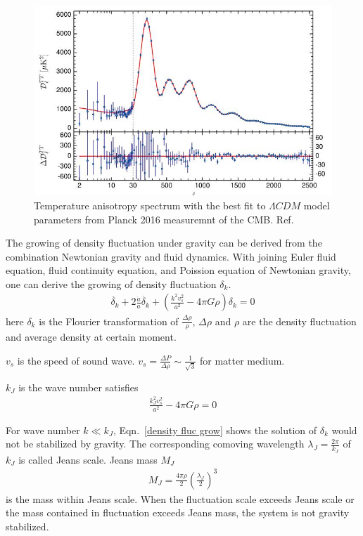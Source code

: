 \begin{figure}[htb]
	\centering
	\includegraphics[width=\figurewidth,clip,trim={0 0 0 0},angle=0,origin=c]{Figures/Intro/CMBSpectrumTT.jpg}
	\caption[Temperature anisotropy spectrum of Cosmic Microwave Background]{Temperature anisotropy spectrum with the best fit to $\Lambda CDM$ model parameters from Planck 2016 measuremnt of the CMB. Ref.~\cite{Ade2016}}
	\label{fig:CMBSpectrum}
\end{figure}

The growing of density fluctuation under gravity can be derived from the combination Newtonian gravity and fluid dynamics. With joining Euler fluid equation, fluid continuity equation, and Poission equation of Newtonian gravity, one can derive the growing of density fluctuation $\delta_k$. 
\begin{align}
\label{density fluc grow}
\ddot{\delta_k} + 2 \frac{\dot{a}}{a} \dot{\delta_k} + (\frac{k^2 v_s^2}{a^2}-4 \pi G \rho) \delta_k = 0
\end{align}
here $\delta_k$ is the Flourier transformation of $\frac{\Delta \rho}{\rho}$, $\Delta \rho$ and $\rho$ are the density fluctuation and average density at certain moment. 

$v_s$ is the speed of sound wave. $v_s = \frac{\Delta P}{\Delta \rho} \sim \frac{1}{\sqrt{3}} $ for matter medium.

$k_J$ is the wave number satisfies
\begin{align}
\frac{k_J^2 v_s^2}{a^2}-4 \pi G \rho = 0  
\end{align}

For wave number $k \ll k_J$, Eqn.~\ref{density fluc grow} shows the solution of $\delta_k$ would not be stabilized by gravity. The corresponding comoving wavelength $\lambda_J = \frac{2 \pi}{k_J}$ of $k_J$ is called Jeans scale. Jeans mass $M_J$
\begin{align}
M_J = \frac{4 \pi \rho}{2} (\frac{\lambda_J}{2})^3
\end{align}
is the mass within Jeans scale. When the fluctuation scale exceeds Jeans scale or the mass contained in fluctuation exceeds Jeans mass, the system is not gravity stabilized.

